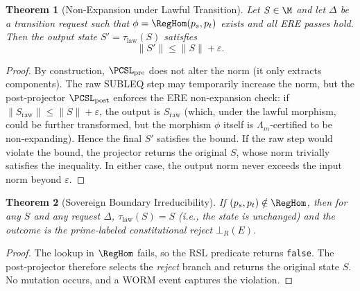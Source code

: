 \documentclass[11pt,a4paper]{article}
\newtheorem{theorem}{Theorem}[section]
\theoremstyle{definition}
\theoremstyle{remark}
\newcommand{\norm}[1]{\|#1\|}
\begin{document}
\begin{theorem}[Non‑Expansion under Lawful Transition]\label{thm:non-exp}
Let $S \in \M$ and let $\Delta$ be a transition request such that $\phi = \RegHom(p_s, p_t)$ exists and all ERE passes hold. Then the output state $S' = \tau_{\text{law}}(S)$ satisfies
\[
\norm{S'} \le \norm{S} + \varepsilon .
\]
\end{theorem}
\begin{proof}
By construction, $\PCSL_{\text{pre}}$ does not alter the norm (it only extracts components). The raw SUBLEQ step may temporarily increase the norm, but the post‑projector $\PCSL_{\text{post}}$ enforces the ERE non‑expansion check: if $\norm{S_{\text{raw}}} \le \norm{S} + \varepsilon$, the output is $S_{\text{raw}}$ (which, under the lawful morphism, could be further transformed, but the morphism $\phi$ itself is $\Lambda_m$‑certified to be non‑expanding). Hence the final $S'$ satisfies the bound. If the raw step would violate the bound, the projector returns the original $S$, whose norm trivially satisfies the inequality. In either case, the output norm never exceeds the input norm beyond $\varepsilon$.
\end{proof}

\begin{theorem}[Sovereign Boundary Irreducibility]\label{thm:boundary}
If $(p_s, p_t) \notin \RegHom$, then for any $S$ and any request $\Delta$, $\tau_{\text{law}}(S) = S$ (i.e., the state is unchanged) and the outcome is the prime‑labeled constitutional reject $\bot_R(E)$.
\end{theorem}
\begin{proof}
The lookup in $\RegHom$ fails, so the RSL predicate returns \texttt{false}. The post‑projector therefore selects the \emph{reject} branch and returns the original state $S$. No mutation occurs, and a WORM event captures the violation.
\end{proof}
\end{document}
